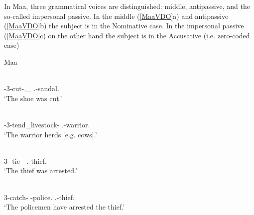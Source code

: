 In Maa, three grammatical voices are distinguished: middle, antipassive, and the so-called impersonal passive.
In the middle (\ref{MaaVDO}a) and antipassive (\ref{MaaVDO}b) the subject is in the Nominative  case. 
In the impersonal passive (\ref{MaaVDO}c) on the other hand the subject is in the Accusative (i.e. zero-coded case)

\enlargethispage{\baselineskip}
\begin{exe}\ex\label{MaaVDO} {Maa} \citep[Nilotic; Kenya; ][]{Payne:2007}\nopagebreak[4] 
\begin{xlist}
\ex\gll{} \\
\con{}-3-cut-\Mid{}.\Non{}\_\pfv{} \fem{}.\sg{}-sandal.\nom{}\\ %
`The shoe was cut.'

\ex\gll{} \\
\con{}-3-tend\_livestock-\antip{} \mas{}.\sg{}-warrior.\nom{}\\
`The warrior herds [e.g. cows].'

\ex\gll{} \\
3-\prf{}-tie-\prf{}-\pass{} \mas{}.\sg{}-thief.\acc{}\\
`The thief was arrested.'

\ex\gll{} 	\\
3-catch-\prf{} \pl{}-police.\nom{} \mas{}.\sg{}-thief.\acc{}\\
`The policemen have arrested the thief.'
\end{xlist}
\end{exe}


